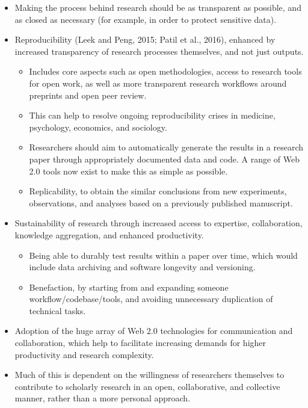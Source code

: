 \documentclass[]{article}
\begin{document}
\begin{itemize}
\item
  Making the process behind research should be as transparent as
  possible, and as closed as necessary (for example, in order to protect
  sensitive data).
\item
  Reproducibility (Leek and Peng, 2015; Patil et al., 2016), enhanced by
  increased transparency of research processes themselves, and not just
  outputs.

  \begin{itemize}
  \item
    Includes core aspects such as open methodologies, access to research
    tools for open work, as well as more transparent research workflows
    around preprints and open peer review.
  \item
    This can help to resolve ongoing reproducibility crises in medicine,
    psychology, economics, and sociology.
  \item
    Researchers should aim to automatically generate the results in a
    research paper through appropriately documented data and code. A
    range of Web 2.0 tools now exist to make this as simple as possible.
  \item
    Replicability, to obtain the similar conclusions from new
    experiments, observations, and analyses based on a previously
    published manuscript.
  \end{itemize}
\item
  Sustainability of research through increased access to expertise,
  collaboration, knowledge aggregation, and enhanced productivity.

  \begin{itemize}
  \item
    Being able to durably test results within a paper over time, which
    would include data archiving and software longevity and versioning.
  \item
    Benefaction, by starting from and expanding someone
    workflow/codebase/tools, and avoiding unnecessary duplication of
    technical tasks.
  \end{itemize}
\item
  Adoption of the huge array of Web 2.0 technologies for communication
  and collaboration, which help to facilitate increasing demands for
  higher productivity and research complexity.
\item
  Much of this is dependent on the willingness of researchers themselves
  to contribute to scholarly research in an open, collaborative, and
  collective manner, rather than a more personal approach.


\end{itemize}
\end{document}
